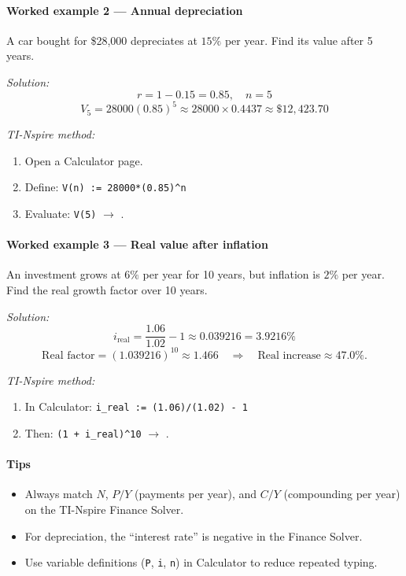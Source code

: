 \documentclass[11pt]{article}
\newcommand{\btn}[1]{\fbox{\sffamily\footnotesize #1}}
\begin{document}
\paragraph*{Worked example 2 — Annual depreciation}
A car bought for \$28{,}000 depreciates at \(15\%\) per year. Find its value after 5 years.

\emph{Solution:}
\[
r = 1 - 0.15 = 0.85, \quad n = 5
\]
\[
V_{5} = 28000(0.85)^{5} \approx 28000 \times 0.4437 \approx \boxed{\$12{,}423.70}
\]

\emph{TI-Nspire method:}
\begin{enumerate}
  \item Open a Calculator page.
  \item Define: \verb|V(n) := 28000*(0.85)^n|
  \item Evaluate: \verb|V(5)| \(\to\) \btn{Enter}.
\end{enumerate}

\paragraph*{Worked example 3 — Real value after inflation}
An investment grows at \(6\%\) per year for 10 years, but inflation is \(2\%\) per year.  
Find the real growth factor over 10 years.

\emph{Solution:}
\[
i_{\text{real}} = \frac{1.06}{1.02} - 1 \approx 0.039216 = 3.9216\%
\]
\[
\text{Real factor} = (1.039216)^{10} \approx 1.466 \quad\Rightarrow\quad \text{Real increase} \approx 47.0\%.
\]

\emph{TI-Nspire method:}
\begin{enumerate}
  \item In Calculator: \verb|i_real := (1.06)/(1.02) - 1|
  \item Then: \verb|(1 + i_real)^10| \(\to\) \btn{Enter}.
\end{enumerate}

\paragraph{Tips}
\begin{itemize}
  \item Always match \(N\), \(P/Y\) (payments per year), and \(C/Y\) (compounding per year) on the TI-Nspire Finance Solver.
  \item For depreciation, the ``interest rate'' is negative in the Finance Solver.
  \item Use variable definitions (\verb|P|, \verb|i|, \verb|n|) in Calculator to reduce repeated typing.
\end{itemize}
\end{document}
